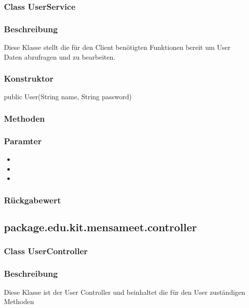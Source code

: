 \documentclass[a4paper]{scrreprt}
\begin{document}

\subsubsection{Class UserService}
\subsubsection*{Beschreibung}
Diese Klasse stellt die für den Client benötigten Funktionen bereit um User Daten abzufragen und zu bearbeiten. 

\subsubsection*{Konstruktor}
public User(String name, String password)

\subsubsection*{Methoden}
\begin{addmargin}[25pt]{0pt}

\subsubsection*{Paramter}
\begin{itemize}
\item
\item
\item
\end{itemize}

\subsubsection*{Rückgabewert}
\end{addmargin}






\subsection{package.edu.kit.mensameet.controller}
\subsubsection{Class UserController}
\subsubsection*{Beschreibung}
Diese Klasse ist der User Controller und beinhaltet die für den User zuständigen Methoden
\end{document}
